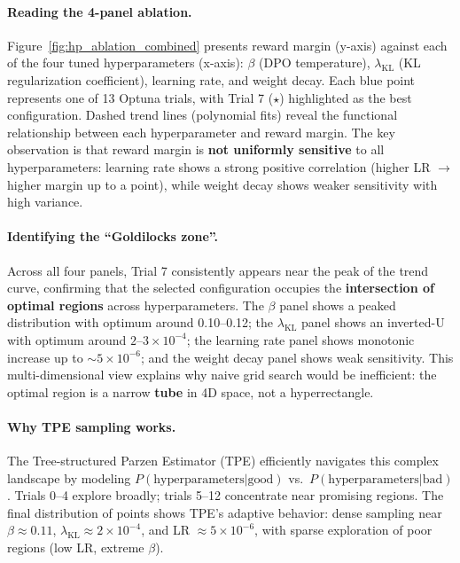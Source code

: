 \paragraph{Reading the 4-panel ablation.}
Figure~\ref{fig:hp_ablation_combined} presents reward margin (y-axis) against each of the four tuned hyperparameters (x-axis): $\beta$ (DPO temperature), $\lambda_{\text{KL}}$ (KL regularization coefficient), learning rate, and weight decay.
Each blue point represents one of 13 Optuna trials, with Trial 7 ($\star$) highlighted as the best configuration.
Dashed trend lines (polynomial fits) reveal the functional relationship between each hyperparameter and reward margin.
The key observation is that reward margin is \textbf{not uniformly sensitive} to all hyperparameters: learning rate shows a strong positive correlation (higher LR $\rightarrow$ higher margin up to a point), while weight decay shows weaker sensitivity with high variance.

\paragraph{Identifying the ``Goldilocks zone''.}
Across all four panels, Trial 7 consistently appears near the peak of the trend curve, confirming that the selected configuration occupies the \textbf{intersection of optimal regions} across hyperparameters.
The $\beta$ panel shows a peaked distribution with optimum around 0.10--0.12; the $\lambda_{\text{KL}}$ panel shows an inverted-U with optimum around $2$--$3 \times 10^{-4}$; the learning rate panel shows monotonic increase up to $\sim 5 \times 10^{-6}$; and the weight decay panel shows weak sensitivity.
This multi-dimensional view explains why naive grid search would be inefficient: the optimal region is a narrow \textbf{tube} in 4D space, not a hyperrectangle.

\paragraph{Why TPE sampling works.}
The Tree-structured Parzen Estimator (TPE) efficiently navigates this complex landscape by modeling $P(\text{hyperparameters} | \text{good})$ vs.\ $P(\text{hyperparameters} | \text{bad})$.
Trials 0--4 explore broadly; trials 5--12 concentrate near promising regions.
The final distribution of points shows TPE's adaptive behavior: dense sampling near $\beta \approx 0.11$, $\lambda_{\text{KL}} \approx 2 \times 10^{-4}$, and LR $\approx 5 \times 10^{-6}$, with sparse exploration of poor regions (low LR, extreme $\beta$).

